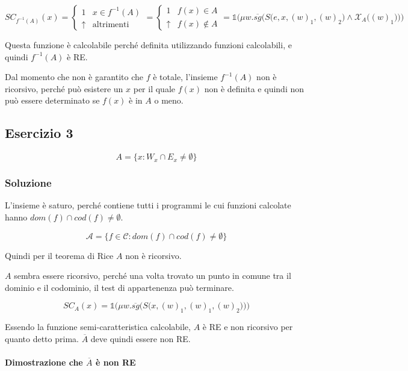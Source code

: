 $$
SC_{f^{-1}(A)}(x) = \begin{cases}
1 & x \in f^{-1}(A) \\
\uparrow &\text{altrimenti}
\end{cases}  = \begin{cases}
1 & f(x) \in A \\
\uparrow &f(x) \notin A
\end{cases} = \mathbb{1}\Bigg( \mu w . \overline{sg}\bigg(S\Big(e,x,(w)_1, (w)_2 \Big) \wedge \mathcal{X}_A\Big((w)_1\Big) \bigg)\Bigg)
$$

Questa funzione è calcolabile perché definita utilizzando funzioni calcolabili, e quindi $f^{-1}(A)$ è RE.

Dal momento che non è garantito che $f$ è totale, l'insieme $f^{-1}(A)$ non è ricorsivo, perché può esistere un $x$ per il quale $f(x)$ non è definita e quindi non può essere determinato se $f(x)$ è in $A$ o meno.

\subsection{Esercizio 3}

$$
A = \{x : W_x \cap E_x \neq \emptyset \}
$$

\subsubsection{Soluzione}

L'insieme è saturo, perché contiene tutti i programmi le cui funzioni calcolate hanno $dom(f) \cap cod(f) \neq \emptyset$.

$$
\mathcal{A} = \{f \in \mathcal{C} : dom(f) \cap cod(f) \neq \emptyset \}
$$

Quindi per il teorema di Rice $A$ non è ricorsivo.

$A$ sembra essere ricorsivo, perché una volta trovato un punto in comune tra il dominio e il codominio, il test di appartenenza può terminare.

$$
SC_A(x) = \mathbb{1} \Bigg(\mu w . \overline{sg} \Big( S\big(x, (w)_1, (w)_1, (w)_2 \big) \Big) \Bigg)
$$

Essendo la funzione semi-caratteristica calcolabile, $A$ è RE e non ricorsivo per quanto detto prima. $\overline{A}$ deve quindi essere non RE.

\paragraph{Dimostrazione che $\overline{A}$ è non RE}


